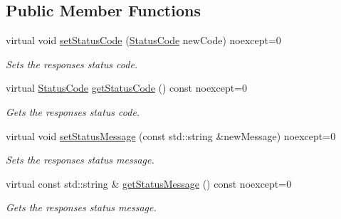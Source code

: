 \subsection*{Public Member Functions}
\begin{DoxyCompactItemize}
\item 
\mbox{\label{classZiApi_1_1HttpResponse_af53d325be33189af4790651b61111818}} 
virtual void \mbox{\hyperlink{classZiApi_1_1HttpResponse_af53d325be33189af4790651b61111818}{set\+Status\+Code}} (\mbox{\hyperlink{classZiApi_1_1HttpResponse_aa304ae6c6c8d12f651eafc75fb203d90}{Status\+Code}} new\+Code) noexcept=0
\begin{DoxyCompactList}\small\item\em Sets the response\textquotesingle{}s status code. \end{DoxyCompactList}\item 
\mbox{\label{classZiApi_1_1HttpResponse_a8d11d9c54e4dc591d6787ac344113800}} 
virtual \mbox{\hyperlink{classZiApi_1_1HttpResponse_aa304ae6c6c8d12f651eafc75fb203d90}{Status\+Code}} \mbox{\hyperlink{classZiApi_1_1HttpResponse_a8d11d9c54e4dc591d6787ac344113800}{get\+Status\+Code}} () const noexcept=0
\begin{DoxyCompactList}\small\item\em Gets the response\textquotesingle{}s status code. \end{DoxyCompactList}\item 
\mbox{\label{classZiApi_1_1HttpResponse_ad119abffde3ba955cc952d04676f5c57}} 
virtual void \mbox{\hyperlink{classZiApi_1_1HttpResponse_ad119abffde3ba955cc952d04676f5c57}{set\+Status\+Message}} (const std\+::string \&new\+Message) noexcept=0
\begin{DoxyCompactList}\small\item\em Sets the response\textquotesingle{}s status message. \end{DoxyCompactList}\item 
\mbox{\label{classZiApi_1_1HttpResponse_a1713f22e0e6d6ea2a4e54b8818a4ab40}} 
virtual const std\+::string \& \mbox{\hyperlink{classZiApi_1_1HttpResponse_a1713f22e0e6d6ea2a4e54b8818a4ab40}{get\+Status\+Message}} () const noexcept=0
\begin{DoxyCompactList}\small\item\em Gets the response\textquotesingle{}s status message. \end{DoxyCompactList}\end{DoxyCompactItemize}
